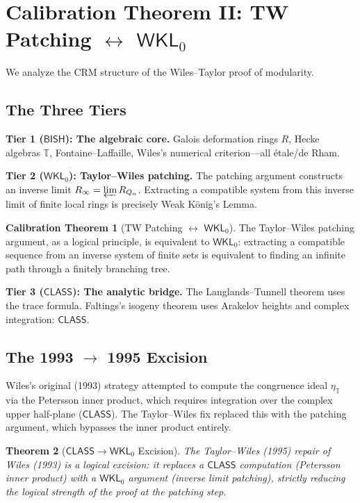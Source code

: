 \documentclass[11pt,a4paper]{article}
\theoremstyle{plain}
\newtheorem{theorem}{Theorem}[section]
\theoremstyle{definition}
\newtheorem{calibration}[theorem]{Calibration Theorem}
\newcommand{\BISH}{\textsf{BISH}}
\newcommand{\WKL}{\textsf{WKL}_0}
\newcommand{\CLASS}{\textsf{CLASS}}
\begin{document}
\section{Calibration Theorem II: TW Patching $\leftrightarrow$ $\WKL$}\label{sec:modularity}

We analyze the CRM structure of the Wiles--Taylor proof of modularity.

\subsection{The Three Tiers}

\textbf{Tier 1 ($\BISH$): The algebraic core.} Galois deformation rings $R$, Hecke algebras $\mathbb{T}$, Fontaine--Laffaille, Wiles's numerical criterion---all \'etale/de Rham.

\textbf{Tier 2 ($\WKL$): Taylor--Wiles patching.} The patching argument constructs an inverse limit $R_\infty = \varprojlim R_{Q_n}$. Extracting a compatible system from this inverse limit of finite local rings is precisely Weak K\"onig's Lemma.

\begin{calibration}[TW Patching $\leftrightarrow$ $\WKL$]\label{cal:tw}
The Taylor--Wiles patching argument, as a logical principle, is equivalent to $\WKL$: extracting a compatible sequence from an inverse system of finite sets is equivalent to finding an infinite path through a finitely branching tree.
\end{calibration}

\textbf{Tier 3 ($\CLASS$): The analytic bridge.} The Langlands--Tunnell theorem uses the trace formula. Faltings's isogeny theorem uses Arakelov heights and complex integration: $\CLASS$.

\subsection{The 1993 $\to$ 1995 Excision}

Wiles's original (1993) strategy attempted to compute the congruence ideal $\eta_\mathbb{T}$ via the Petersson inner product, which requires integration over the complex upper half-plane ($\CLASS$). The Taylor--Wiles fix replaced this with the patching argument, which bypasses the inner product entirely. 

\begin{theorem}[$\CLASS \to \WKL$ Excision]\label{thm:excision}
The Taylor--Wiles (1995) repair of Wiles (1993) is a logical excision: it replaces a $\CLASS$ computation (Petersson inner product) with a $\WKL$ argument (inverse limit patching), strictly reducing the logical strength of the proof at the patching step.
\end{theorem}
\end{document}
